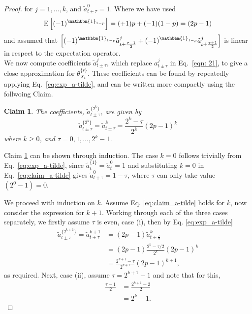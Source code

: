 \documentclass[english]{article}
\newtheorem{claim}{Claim}
\newcommand{\E}{\mathrm{E}}
\begin{document}
\begin{proof}
for $j=1,\dots, k$, and  $\tilde{a}^{0}_{t\pm\tau}=1$.  Where we have used 
\begin{equation}
    \E\left[(-1)^{\mathbbm{1}_{1-p}}\right]=(+1)p + (-1)(1-p)=(2p-1)
\end{equation} and assumed that $\left[(-1)^{\mathbbm{1}_{1-p}}\tilde{a}^{j}_{t\pm\frac{\tau-1}{2}}+(-1)^{\mathbbm{1}_{1-p}}\tilde{a}^{j}_{t\pm\frac{\tau+1}{2}}\right]$ is linear in respect to the expectation operator. \\


We now compute coefficients $\tilde{a}^{j}_{t\pm\tau}$, which replace ${a}^{j}_{t\pm\tau}$ in Eq.~\ref{eqn: 21}, to give a close approximation for $\theta_{X_t}^{\{r\}}$.  These coefficients can be found by repeatedly applying Eq.~\ref{eq:exp_a-tilde}, and can be written more compactly using the follwoing Claim.

\begin{claim}
The coefficients, $\tilde{a}^{\{2^{k}\}}_{t\pm\tau}$, are given by \begin{equation} \label{eq:claim_a-tilde}
    \tilde{a}^{\{2^k\}}_{t\pm\tau}=\tilde{a}^{k}_{t\pm\tau}=\frac{2^k-\tau}{2^k}(2p-1)^k
\end{equation}
where $k\geq 0$, and $\tau =0,1,\ldots,2^k-1$.
\label{claim:1}
\end{claim}

Claim \ref{claim:1} can be shown through induction. The case $k=0$ follows trivially from Eq.~\ref{eq:exp_a-tilde}, since $\tilde{a}^{\{1\}}_t=\tilde{a}^0_t=1$ and substituting $k=0$ in Eq.~\ref{eq:claim_a-tilde} gives $\tilde{a}^0_{t+\tau}=1-\tau$, where $\tau$ can only take value $(2^0-1)=0$.


We proceed with induction on $k$. Assume Eq. \ref{eq:claim_a-tilde} holds for $k$, now consider the expression for $k+1$. Working through each of the three cases separately, we firstly assume $\tau$ is even, case (i), then by Eq. \ref{eq:exp_a-tilde}
\begin{align}\nonumber
\tilde{a}^{\{2^{k+1}\}}_{t\pm\tau}=\tilde{a}^{k+1}_{t\pm\tau}
&=(2p-1)\tilde{a}^{k}_{t\pm\frac{\tau}{2}}
\\ \nonumber
&=(2p-1)\frac{2^k-\tau/2}{2^k}(2p-1)^k
\\ \nonumber
&= \frac{2^{k+1}-\tau}{2^{k+1}}(2p-1)^{k+1},
\end{align}
as required.  Next, case (ii), assume $\tau=2^{k+1}-1$ and note that for this, 
\begin{align} \nonumber
\frac{\tau-1}{2} &=\frac{2^{k+1}-2}{2}
\\ \nonumber
&=2^k-1.
\end{align}


\end{proof}
\end{document}
